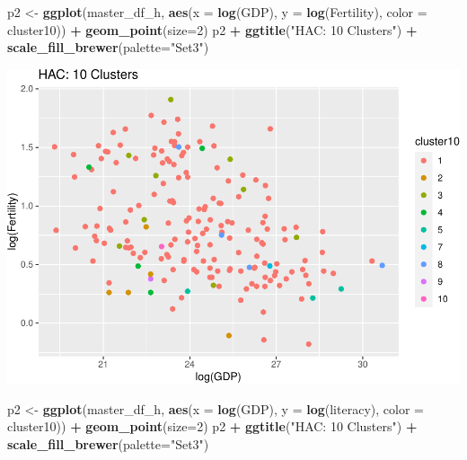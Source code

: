\documentclass[]{article}
\newenvironment{Shaded}{\begin{snugshade}}{\end{snugshade}}
\newcommand{\DataTypeTok}[1]{\textcolor[rgb]{0.13,0.29,0.53}{#1}}
\newcommand{\DecValTok}[1]{\textcolor[rgb]{0.00,0.00,0.81}{#1}}
\newcommand{\KeywordTok}[1]{\textcolor[rgb]{0.13,0.29,0.53}{\textbf{#1}}}
\newcommand{\NormalTok}[1]{#1}
\newcommand{\OperatorTok}[1]{\textcolor[rgb]{0.81,0.36,0.00}{\textbf{#1}}}
\newcommand{\StringTok}[1]{\textcolor[rgb]{0.31,0.60,0.02}{#1}}
\begin{document}
\begin{Shaded}
\begin{Highlighting}[]
\NormalTok{p2 <-}\StringTok{ }\KeywordTok{ggplot}\NormalTok{(master_df_h, }\KeywordTok{aes}\NormalTok{(}\DataTypeTok{x =} \KeywordTok{log}\NormalTok{(GDP), }\DataTypeTok{y =} \KeywordTok{log}\NormalTok{(Fertility), }\DataTypeTok{color =}\NormalTok{ cluster10)) }\OperatorTok{+}
\StringTok{  }\KeywordTok{geom_point}\NormalTok{(}\DataTypeTok{size=}\DecValTok{2}\NormalTok{)}
\NormalTok{p2 }\OperatorTok{+}\StringTok{ }\KeywordTok{ggtitle}\NormalTok{(}\StringTok{"HAC: 10 Clusters"}\NormalTok{) }\OperatorTok{+}\StringTok{ }\KeywordTok{scale_fill_brewer}\NormalTok{(}\DataTypeTok{palette=}\StringTok{"Set3"}\NormalTok{)}
\end{Highlighting}
\end{Shaded}

\includegraphics{eda_files/figure-latex/unnamed-chunk-30-3.pdf}

\begin{Shaded}
\begin{Highlighting}[]
\NormalTok{p2 <-}\StringTok{ }\KeywordTok{ggplot}\NormalTok{(master_df_h, }\KeywordTok{aes}\NormalTok{(}\DataTypeTok{x =} \KeywordTok{log}\NormalTok{(GDP), }\DataTypeTok{y =} \KeywordTok{log}\NormalTok{(literacy), }\DataTypeTok{color =}\NormalTok{ cluster10)) }\OperatorTok{+}
\StringTok{  }\KeywordTok{geom_point}\NormalTok{(}\DataTypeTok{size=}\DecValTok{2}\NormalTok{)}
\NormalTok{p2 }\OperatorTok{+}\StringTok{ }\KeywordTok{ggtitle}\NormalTok{(}\StringTok{"HAC: 10 Clusters"}\NormalTok{) }\OperatorTok{+}\StringTok{ }\KeywordTok{scale_fill_brewer}\NormalTok{(}\DataTypeTok{palette=}\StringTok{"Set3"}\NormalTok{)}
\end{Highlighting}
\end{Shaded}
\end{document}
